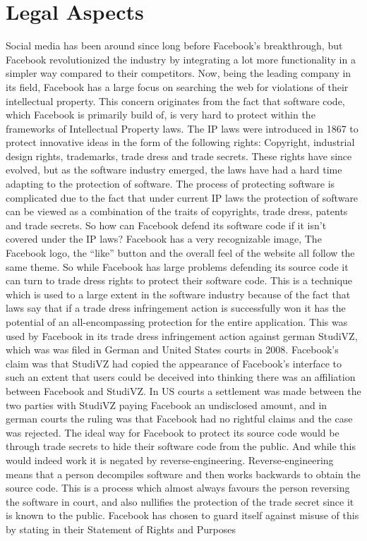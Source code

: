 \documentclass[conference]{IEEEtran}
\begin{document}
\section{Legal Aspects}
\label{legal}
Social media has been around since long before Facebook’s breakthrough, but Facebook revolutionized the industry by integrating a lot more functionality in a simpler way compared to their competitors. Now, being the leading company in its field, Facebook has a large focus on searching the web for violations of their intellectual property\cite{nguyen2012}. This concern originates from the fact that software code, which Facebook is primarily build of, is very hard to protect within the frameworks of Intellectual Property laws. The IP laws were introduced in 1867\cite{wikiIntellect} to protect innovative ideas in the form of the following rights: Copyright, industrial design rights, trademarks, trade dress and trade secrets. These rights have since evolved, but as the software industry emerged, the laws have had a hard time adapting to the protection of software. The process of protecting software is complicated due to the fact that under current IP laws the protection of software can be viewed as a combination of the traits of copyrights, trade dress, patents and trade secrets\cite{nguyen2012}.  
So how can Facebook defend its software code if it isn’t covered under the IP laws? Facebook has a very recognizable image, The Facebook logo, the “like” button and the overall feel of the website all follow the same theme. So while Facebook has large problems defending its source code it can turn to trade dress rights to protect their software code. This is a technique which is used to a large extent in the software industry because of the fact that laws say that if a trade dress infringement action is successfully won it has the potential of an all-encompassing protection for the entire application\cite{king2000}. This was used by Facebook in its trade dress infringement action against german StudiVZ\cite{nguyen2012}, which was was filed in German and United States courts in 2008\cite{facevsstudi}. Facebook’s claim was that StudiVZ had copied the appearance of Facebook’s interface to such an extent that users could be deceived into thinking there was an affiliation between Facebook and StudiVZ. In US courts a settlement was made between the two parties with StudiVZ paying Facebook an undisclosed amount, and in german courts the ruling was that Facebook had no rightful claims and the case was rejected.
The ideal way for Facebook to protect its source code would be through trade secrets to hide their software code from the public. And while this would indeed work it is negated by reverse-engineering. Reverse-engineering means that a person decompiles software and then works backwards to obtain the source code\cite{nguyen2012}. This is a process which almost always favours the person reversing the software in court\cite{reverse}, and also nullifies the protection of the trade secret since it is known to the public\cite{nguyen2012}. Facebook has chosen to guard itself against misuse of this by stating in their Statement of Rights and Purposes
\end{document}
